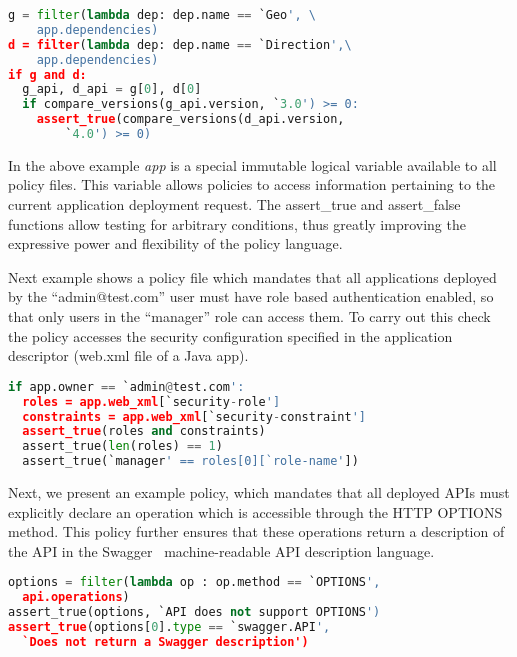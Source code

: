 \vspace{0.05in}
{\footnotesize
\begin{lstlisting}[language=Python, frame=single, showstringspaces=false]
g = filter(lambda dep: dep.name == `Geo', \
	app.dependencies)
d = filter(lambda dep: dep.name == `Direction',\
	app.dependencies)
if g and d:
  g_api, d_api = g[0], d[0]
  if compare_versions(g_api.version, `3.0') >= 0:
    assert_true(compare_versions(d_api.version, 
    	`4.0') >= 0)
\end{lstlisting}
}
\vspace{0.05in}

In the above example \textit{app} is a special immutable logical variable available to
all policy files. This variable allows policies to access information
pertaining to the current application deployment request. The assert\_true and assert\_false
functions allow testing for arbitrary conditions, thus greatly improving the expressive
power and flexibility of the policy language.

Next example shows a policy file which mandates that all applications deployed
by the ``admin@test.com'' user must have role based authentication enabled, so that only
users in the ``manager'' role can access them. To carry out this check the policy accesses
the security configuration specified in the application descriptor (web.xml file of a Java app).

\vspace{0.05in}
{\footnotesize
\begin{lstlisting}[language=Python, frame=single, showstringspaces=false]
if app.owner == `admin@test.com':
  roles = app.web_xml[`security-role']
  constraints = app.web_xml[`security-constraint']
  assert_true(roles and constraints)
  assert_true(len(roles) == 1)
  assert_true(`manager' == roles[0][`role-name'])
\end{lstlisting}
}
\vspace{0.05in}

Next, we present an example policy, which mandates that all deployed APIs must explicitly
declare an operation which is accessible through the HTTP OPTIONS method. This policy further ensures
that these operations return a description of the API in the Swagger~\cite{hl:swagger} machine-readable API
description language.

\vspace{0.05in}
{\footnotesize
\begin{lstlisting}[language=Python, frame=single, showstringspaces=false]
options = filter(lambda op : op.method == `OPTIONS',  
  api.operations)
assert_true(options, `API does not support OPTIONS')
assert_true(options[0].type == `swagger.API', 
  `Does not return a Swagger description')
\end{lstlisting}
}
\vspace{0.05in}


